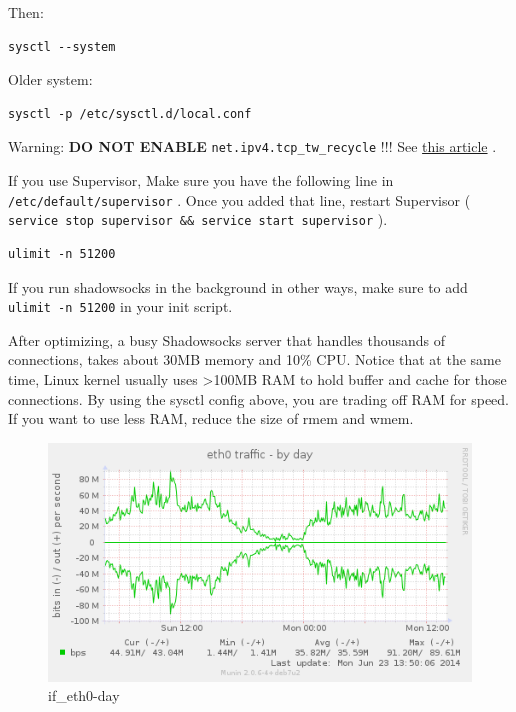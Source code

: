 \documentclass[11pt,a4paper]{sphinxmanual}
\begin{document}
Then:
\begin{Verbatim}
sysctl --system
\end{Verbatim}

Older system:
\begin{Verbatim}
sysctl -p /etc/sysctl.d/local.conf
\end{Verbatim}

Warning: \textbf{DO NOT ENABLE} \verb~net.ipv4.tcp_tw_recycle~ !!! See \href{http://vincent.bernat.im/en/blog/2014-tcp-time-wait-state-linux.html}{this article} .

If you use Supervisor, Make sure you have the following line in \verb~/etc/default/supervisor~ . Once you added that line, restart Supervisor ( \verb~service stop supervisor && service start supervisor~ ).

\begin{Verbatim}
ulimit -n 51200
\end{Verbatim}

If you run shadowsocks in the background in other ways, make sure to add \verb~ulimit -n 51200~ in your init script.

After optimizing, a busy Shadowsocks server that handles thousands of connections, takes about 30MB memory and 10\% CPU. Notice that at the same time, Linux kernel usually uses >100MB RAM to hold buffer and cache for those connections. By using the sysctl config above, you are trading off RAM for speed. If you want to use less RAM, reduce the size of rmem and wmem.

\begin{figure}[H]
\centering
\includegraphics[keepaspectratio,max width=0.95\linewidth]{images/2a18bc5a-fadf-11e3-96c3-473c42f1a3a3.png}
\caption{if\_eth0-day}
\end{figure}
\end{document}
